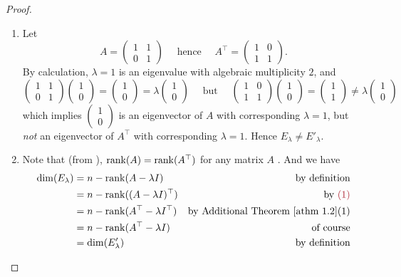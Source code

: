 \begin{proof} \ 

\begin{enumerate}
\item Let
\[
    A = \begin{pmatrix} 1 & 1 \\ 0 & 1 \end{pmatrix}
    \quad \text{ hence } \quad
    A^\top = \begin{pmatrix} 1 & 0 \\ 1 & 1 \end{pmatrix}.
\]
By calculation, \(\lambda = 1\) is an eigenvalue with algebraic multiplicity \(2\), and
\[
    \begin{pmatrix} 1 & 1 \\ 0 & 1 \end{pmatrix}
    \begin{pmatrix} 1 \\ 0 \end{pmatrix} = \begin{pmatrix} 1 \\ 0 \end{pmatrix}
    = \lambda \begin{pmatrix} 1 \\ 0 \end{pmatrix}
    \quad \text{ but } \quad
    \begin{pmatrix} 1 & 0 \\ 1 & 1 \end{pmatrix}
    \begin{pmatrix} 1 \\ 0 \end{pmatrix} = \begin{pmatrix} 1 \\ 1 \end{pmatrix}
    \ne \lambda \begin{pmatrix} 1 \\ 0 \end{pmatrix}
\]
which implies \(\begin{pmatrix} 1 \\ 0 \end{pmatrix}\) is an eigenvector of \(A\) with corresponding \(\lambda = 1\), but \emph{not} an eigenvector of \(A^\top\) with corresponding \(\lambda = 1\).
Hence \(E_{\lambda} \ne E'_{\lambda}\).

\item
Note that (from ), \(\mathrm{rank}(A) = \mathrm{rank}(A^\top)\) for any matrix \(A\) .
And we have
\begin{align*}
    \dim(E_{\lambda}) & = n - \rank(A - \lambda I) & \text{by definition}
    \\
        & = n - \rank((A - \lambda I)^\top) & \text{by \MAROON{(1)}} \\
        & = n - \rank(A^\top - \lambda I^\top) & \text{by \ATHM{1.2}(1)} \\
        & = n - \rank(A^\top - \lambda I) & \text{of course} \\
        & = \dim(E'_{\lambda}) & \text{by definition}
\end{align*}


\end{enumerate}
\end{proof}
